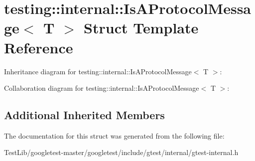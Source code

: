\hypertarget{structtesting_1_1internal_1_1IsAProtocolMessage}{}\section{testing\+:\+:internal\+:\+:Is\+A\+Protocol\+Message$<$ T $>$ Struct Template Reference}
\label{structtesting_1_1internal_1_1IsAProtocolMessage}


Inheritance diagram for testing\+:\+:internal\+:\+:Is\+A\+Protocol\+Message$<$ T $>$\+:


Collaboration diagram for testing\+:\+:internal\+:\+:Is\+A\+Protocol\+Message$<$ T $>$\+:
\subsection*{Additional Inherited Members}


The documentation for this struct was generated from the following file\+:\begin{DoxyCompactItemize}
\item 
Test\+Lib/googletest-\/master/googletest/include/gtest/internal/gtest-\/internal.\+h\end{DoxyCompactItemize}
